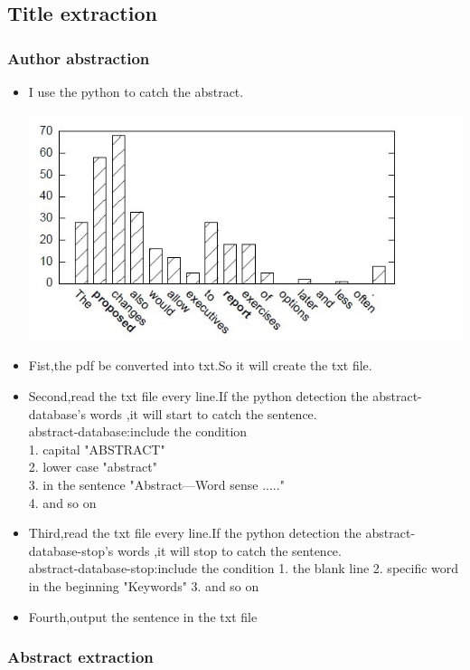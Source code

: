 	
\subsection*{Title extraction}

\subsubsection*{Author abstraction}
\begin{itemize}
	\item I use the python to catch the abstract.
	\begin{center}
		\includegraphics[width=0.8\columnwidth]{Union_Background_Chart_2}
	\end{center}
	\item Fist,the pdf be converted into txt.So it will create the txt file.\\ 
	\item Second,read the txt file every line.If the python detection the abstract-database's words ,it will start to catch the sentence.\\ 	
	abstract-database:include the condition\\
	    1. capital         "ABSTRACT"\\
	    2. lower case      "abstract"\\
	    3. in the sentence "Abstract—Word sense ....."\\
	    4. and so on \\
	\item Third,read the txt file every line.If the python detection the abstract-database-stop's words ,it will stop to catch the sentence.\\ 
    abstract-database-stop:include the condition
    1. the blank line
    2. specific word in the beginning "Keywords"
    3. and so on
	\item Fourth,output the sentence in the txt file\\ 	

\end{itemize}

\subsubsection*{Abstract extraction}

\newpage %